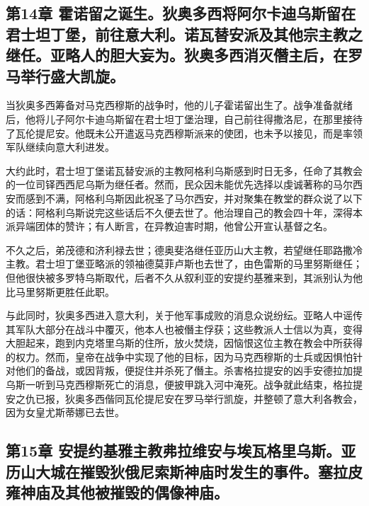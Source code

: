 \subsection{第14章 霍诺留之诞生。狄奥多西将阿尔卡迪乌斯留在君士坦丁堡，前往意大利。诺瓦替安派及其他宗主教之继任。亚略人的胆大妄为。狄奥多西消灭僭主后，在罗马举行盛大凯旋。}

当狄奥多西筹备对马克西穆斯的战争时，他的儿子霍诺留出生了。战争准备就绪后，他将儿子阿尔卡迪乌斯留在君士坦丁堡治理，自己前往得撒洛尼，在那里接待了瓦伦提尼安。他既未公开遣返马克西穆斯派来的使团，也未予以接见，而是率领军队继续向意大利进发。\par

大约此时，君士坦丁堡诺瓦替安派的主教阿格利乌斯感到时日无多，任命了其教会的一位司铎西西尼乌斯为继任者。然而，民众因未能优先选择以虔诚著称的马尔西安而感到不满，阿格利乌斯因此祝圣了马尔西安，并对聚集在教堂的群众说了以下的话：阿格利乌斯说完这些话后不久便去世了。他治理自己的教会四十年，深得本派异端团体的赞许；有人断言，在异教迫害时期，他曾公开宣认基督之名。\par

不久之后，弟茂德和济利禄去世；德奥斐洛继任亚历山大主教，若望继任耶路撒冷主教。君士坦丁堡亚略派的领袖德莫菲卢斯也去世了，由色雷斯的马里努斯继任；但他很快被多罗特乌斯取代，后者不久从叙利亚的安提约基雅来到，其派别认为他比马里努斯更胜任此职。\par

与此同时，狄奥多西进入意大利，关于他军事成败的消息众说纷纭。亚略人中谣传其军队大部分在战斗中覆灭，他本人也被僭主俘获；这些教派人士信以为真，变得大胆起来，跑到内克塔里乌斯的住所，放火焚烧，因恼恨这位主教在教会中所获得的权力。然而，皇帝在战争中实现了他的目标，因为马克西穆斯的士兵或因惧怕针对他们的备战，或因背叛，便捉住并杀死了僭主。杀害格拉提安的凶手安德拉加提乌斯一听到马克西穆斯死亡的消息，便披甲跳入河中淹死。战争就此结束，格拉提安之仇已报，狄奥多西偕同瓦伦提尼安在罗马举行凯旋，并整顿了意大利各教会，因为女皇尤斯蒂娜已去世。\par


\subsection{第15章 安提约基雅主教弗拉维安与埃瓦格里乌斯。亚历山大城在摧毁狄俄尼索斯神庙时发生的事件。塞拉皮雍神庙及其他被摧毁的偶像神庙。}

